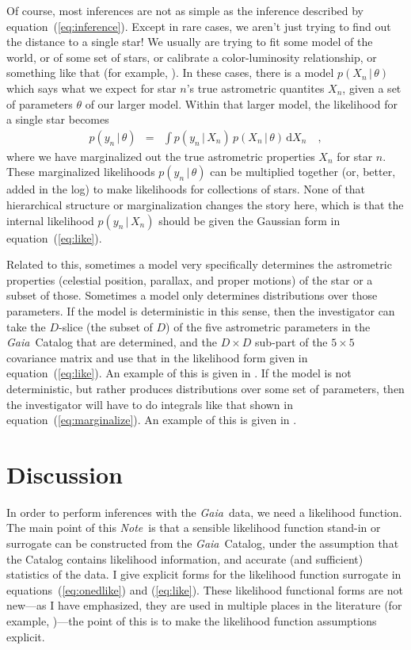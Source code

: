 \documentclass[12pt, modern]{aastex62h}
\newcommand{\Gaia}{\textsl{Gaia}}
\newcommand{\documentname}{\textsl{Note}}
\newcommand{\equationname}{equation}
\newcommand{\dd}{\mathrm{d}}
\newcommand{\given}{\,|\,}
\begin{document}
Of course, most inferences are not as simple as the inference described by
\equationname~(\ref{eq:inference}).
Except in rare cases, we aren't just trying to find out the distance to a single
star!
We usually are trying to fit some model of the world, or of some set of stars,
or calibrate a color-luminosity relationship, or something like that
(for example, \citealt{sesar, hawkins, leistedt, oh, anderson}).
In these cases, there is a model $p(X_n\given\theta)$ which says what we expect
for star $n$'s true astrometric quantites $X_n$, given a set of parameters $\theta$
of our larger model.
Within that larger model, the likelihood for a single star becomes
\begin{eqnarray}
p(y_n\given\theta) &=& \int p(y_n\given X_n)\,p(X_n\given\theta)\,\dd X_n
\label{eq:marginalize}
\quad ,
\end{eqnarray}
where we have marginalized out the true astrometric properties $X_n$ for star $n$.
These marginalized likelihoods $p(y_n\given\theta)$
can be multiplied together (or, better, added in the log)
to make likelihoods for collections of stars.
None of that hierarchical structure or marginalization changes the story here,
which is that the internal likelihood $p(y_n\given X_n)$ should be given the
Gaussian form in \equationname~(\ref{eq:like}).

Related to this, sometimes a model very specifically determines the
astrometric properties (celestial position, parallax, and proper
motions) of the star or a subset of those. Sometimes a model only
determines distributions over those parameters.
If the model is deterministic in this sense, then the investigator can take
the $D$-slice (the subset of $D$) of the five astrometric parameters
in the \Gaia\ Catalog that are determined,
and the $D\times D$ sub-part of the $5\times 5$ covariance matrix
and use that in the likelihood form given in \equationname~(\ref{eq:like}).
An example of this is given in \citet{tri2}.
If the model is not deterministic, but rather produces distributions
over some set of parameters, then the investigator will have to do integrals
like that shown in \equationname~(\ref{eq:marginalize}).
An example of this is given in \citet{oh}.

\section{Discussion}
In order to perform inferences
with the \Gaia\ data, we need a likelihood function.
The main point of this \documentname\ is that a sensible likelihood function
stand-in or surrogate can be constructed from the \Gaia\ Catalog, under the assumption
that the Catalog contains likelihood information, and accurate (and sufficient)
statistics of the data.
I give explicit forms for the likelihood function surrogate in
\equationname s~(\ref{eq:onedlike}) and (\ref{eq:like}).
These likelihood functional forms are not new---as I have emphasized,
they are used in multiple places
in the literature (for example, \citealt{tri2, leistedt, oh})---the point of
this is to make the
likelihood function assumptions explicit.
\end{document}
